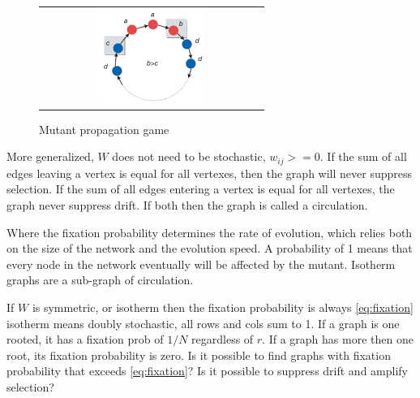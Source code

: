 \begin{figure}[h]
\centering
\begin{tabular}{@{}c@{}}
\includegraphics[width=0.5\textwidth]{natureGameSingle.png}
\end{tabular}
\caption{\label{fig:game} Mutant propagation game}
\end{figure}

More generalized, $W$ does not need to be stochastic, $w_{ij}>=0$. 
If the sum of all edges leaving a vertex is equal for all vertexes, then the graph will never suppress selection.
If the sum of all edges entering a vertex is equal for all vertexes, the graph never suppress drift.
If both then the graph is called a circulation.
     

Where the fixation probability determines the rate of evolution, which relies both on the size of the network and the evolution speed. A probability of 1 means that every node in the network eventually will be affected by the mutant.   
Isotherm graphs are a sub-graph of circulation. 

If $W$ is symmetric, or isotherm then the fixation probability is always \ref{eq:fixation}
isotherm means doubly stochastic, all rows and cols sum to 1. 
If a graph is one rooted, it has a fixation prob of $1/N$ regardless of $r$. If a graph has more then one root, its fixation probability is zero. 
Is it possible to find graphs with fixation probability that exceeds \ref{eq:fixation}? Is it possible to suppress drift and amplify selection?

